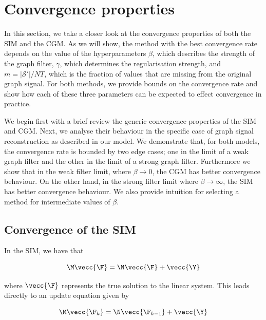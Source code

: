 \section{Convergence properties}

\label{sec:convergence}


In this section, we take a closer look at the convergence properties of both the SIM and the CGM. As we will show, the method with the best convergence rate depends on the value of the hyperparameters $\beta$, which describes the strength of the graph filter, $\gamma$, which determines the regularisation strength, and $m=|\mathcal{S}'|/NT$, which is the fraction of values that are missing from the original graph signal. For both methods, we provide bounds on the convergence rate and show how each of these three parameters can be expected to effect convergence in practice. 

We begin first with a brief review the generic convergence properties of the SIM and CGM. Next, we analyse their behaviour in the specific case of graph signal reconstruction as described in our model. We demonstrate that, for both models, the convergence rate is bounded by two edge cases; one in the limit of a weak graph filter and the other in the limit of a strong graph filter. Furthermore we show that in the weak filter limit, where $\beta \rightarrow 0$, the CGM has better convergence behaviour. On the other hand, in the strong filter limit where $\beta \rightarrow \infty$, the SIM has better convergence behaviour. We also provide intuition for selecting a method for intermediate values of $\beta$. 


\subsection{Convergence of the SIM}
\label{sec:SIM_convergence}

In the SIM, we have that 

\begin{equation}
    \label{eq:SIM_F_true}
\M \vecc{\F} =  \N \vecc{\F} + \vecc{\Y}
\end{equation}

where $\vecc{\F}$ represents the true solution to the linear system. This leads directly to an update equation given by

\begin{equation}
    \label{eq:SIM_F_update}
\M \vecc{\F_k} = \N \vecc{\F_{k-1}} + \vecc{\Y}
\end{equation}

